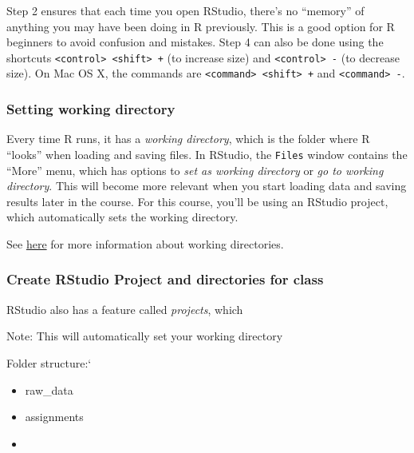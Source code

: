 \documentclass[
]{article}
\newenvironment{bonus}{
  \specialblock{bonus}{sun-fill.png}{Bonus}
}{\endspecialblock}
\begin{document}
Step 2 ensures that each time you open RStudio, there's no ``memory'' of anything you may have been doing in R previously.
This is a good option for R beginners to avoid confusion and mistakes.
Step 4 can also be done using the shortcuts \texttt{\textless{}control\textgreater{}\ \textless{}shift\textgreater{}\ +} (to increase size) and \texttt{\textless{}control\textgreater{}\ -} (to decrease size).
On Mac OS X, the commands are \texttt{\textless{}command\textgreater{}\ \textless{}shift\textgreater{}\ +} and \texttt{\textless{}command\textgreater{}\ -}.

\hypertarget{setting-working-directory}{%
\subsubsection{Setting working directory}\label{setting-working-directory}}

Every time R runs, it has a \emph{working directory}, which is the folder where R ``looks'' when loading and saving files.
In RStudio, the \texttt{Files} window contains the ``More'' menu, which has options to \emph{set as working directory} or \emph{go to working directory}.
This will become more relevant when you start loading data and saving results later in the course.
For this course, you'll be using an RStudio project, which automatically sets the working directory.

\begin{bonus}
See
\href{https://support.rstudio.com/hc/en-us/articles/200711843-Working-Directories-and-Workspaces}{here}
for more information about working directories.
\end{bonus}

\hypertarget{create-rstudio-project-and-directories-for-class}{%
\subsubsection{Create RStudio Project and directories for class}\label{create-rstudio-project-and-directories-for-class}}

RStudio also has a feature called \emph{projects}, which

Note: This will automatically set your working directory

Folder structure:`

\begin{itemize}
\item
  raw\_data
\item
  assignments
\item
\end{itemize}
\end{document}

